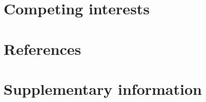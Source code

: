 \documentclass{article}
\begin{document}



\section{Competing interests}

\section{References}



\section{Supplementary information}
\end{document}

